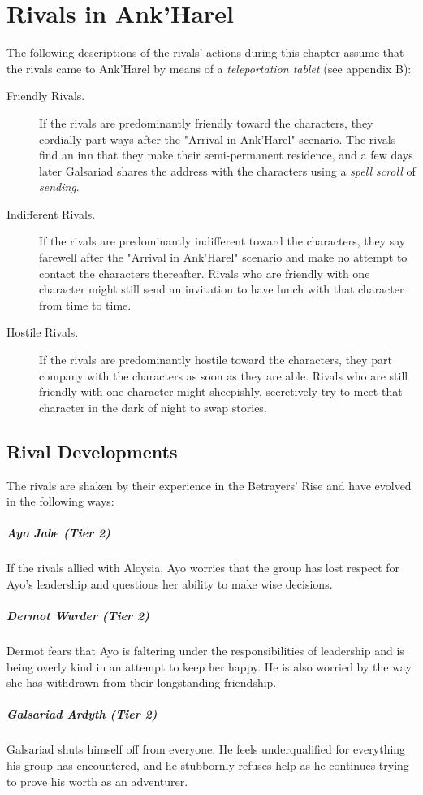 \documentclass[10pt,a4paper,twoside,fancy,bg=print,twocolumn,openany,nodeprecatedcode]{dndbook}
\begin{document}
\section{Rivals in Ank'Harel}
The following descriptions of the rivals' actions during this chapter assume that the rivals came to Ank'Harel by means of a \textit{teleportation tablet} (see appendix B):


\begin{description}
\item[Friendly Rivals.]
If the rivals are predominantly friendly toward the characters, they cordially part ways after the "Arrival in Ank'Harel" scenario. The rivals find an inn that they make their semi-permanent residence, and a few days later Galsariad shares the address with the characters using a \textit{spell scroll} of \textit{sending}.
\item[Indifferent Rivals.]
If the rivals are predominantly indifferent toward the characters, they say farewell after the "Arrival in Ank'Harel" scenario and make no attempt to contact the characters thereafter. Rivals who are friendly with one character might still send an invitation to have lunch with that character from time to time.
\item[Hostile Rivals.]
If the rivals are predominantly hostile toward the characters, they part company with the characters as soon as they are able. Rivals who are still friendly with one character might sheepishly, secretively try to meet that character in the dark of night to swap stories.
\end{description}

\subsection{Rival Developments}
The rivals are shaken by their experience in the Betrayers' Rise and have evolved in the following ways:

\subparagraph{Ayo Jabe (Tier 2)}
If the rivals allied with Aloysia, Ayo worries that the group has lost respect for Ayo's leadership and questions her ability to make wise decisions.

\subparagraph{Dermot Wurder (Tier 2)}
Dermot fears that Ayo is faltering under the responsibilities of leadership and is being overly kind in an attempt to keep her happy. He is also worried by the way she has withdrawn from their longstanding friendship.

\subparagraph{Galsariad Ardyth (Tier 2)}
Galsariad shuts himself off from everyone. He feels underqualified for everything his group has encountered, and he stubbornly refuses help as he continues trying to prove his worth as an adventurer.
\end{document}
